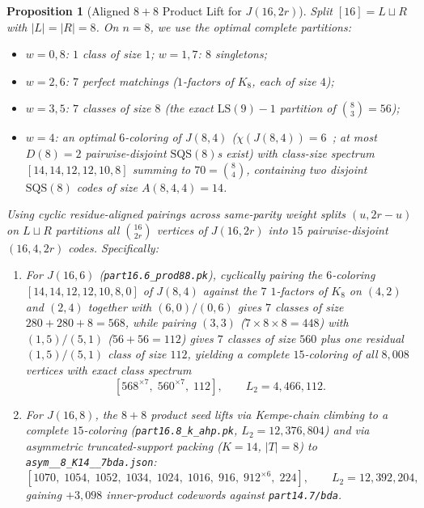 \documentclass[11pt,letterpaper]{article}
\theoremstyle{plain}
\newtheorem{proposition}{Proposition}
\theoremstyle{definition}
\theoremstyle{remark}
\begin{document}
\begin{proposition}[Aligned $8{+}8$ Product Lift for $J(16, 2r)$]
\label{prop:prod88}
Split $[16] = L \sqcup R$ with $|L| = |R| = 8$. On $n = 8$, we use the optimal complete partitions:
\begin{itemize}[leftmargin=1.6em,itemsep=1pt]
    \item $w = 0, 8$: $1$ class of size $1$; \quad $w = 1, 7$: $8$ singletons;
    \item $w = 2, 6$: $7$ perfect matchings ($1$-factors of $K_8$, each of size $4$);
    \item $w = 3, 5$: $7$ classes of size $8$ (the exact $\mathrm{LS}(9){-}1$ partition of $\binom{8}{3} = 56$);
    \item $w = 4$: an optimal $6$-coloring of $J(8,4)$ ($\chi(J(8,4)) = 6$~\cite{EtzionBitan1996}; at most $D(8) = 2$ pairwise-disjoint $\mathrm{SQS}(8)$s exist) with class-size spectrum $[14, 14, 12, 12, 10, 8]$ summing to $70 = \binom{8}{4}$, containing two disjoint $\mathrm{SQS}(8)$ codes of size $A(8,4,4) = 14$.
\end{itemize}
Using cyclic residue-aligned pairings across same-parity weight splits $(u, 2r - u)$ on $L \sqcup R$ partitions all $\binom{16}{2r}$ vertices of $J(16, 2r)$ into $15$ pairwise-disjoint $(16, 4, 2r)$ codes. Specifically:
\begin{enumerate}[leftmargin=1.6em,itemsep=1pt]
    \item For $J(16, 6)$ (\texttt{part16.6\_prod88.pk}), cyclically pairing the $6$-coloring $[14, 14, 12, 12, 10, 8, 0]$ of $J(8,4)$ against the $7$ $1$-factors of $K_8$ on $(4,2)$ and $(2,4)$ together with $(6,0)/(0,6)$ gives $7$ classes of size $280 + 280 + 8 = 568$, while pairing $(3,3)$ ($7 \times 8 \times 8 = 448$) with $(1,5)/(5,1)$ ($56 + 56 = 112$) gives $7$ classes of size $560$ plus one residual $(1,5)/(5,1)$ class of size $112$, yielding a complete $15$-coloring of all $8{,}008$ vertices with exact class spectrum
    \[
    [568^{\times 7},\; 560^{\times 7},\; 112], \qquad L_2 = 4{,}466{,}112.
    \]
    \item For $J(16, 8)$, the $8{+}8$ product seed lifts via Kempe-chain climbing to a complete $15$-coloring (\texttt{part16.8\_\allowbreak k\_ahp.pk}, $L_2 = 12{,}376{,}804$) and via asymmetric truncated-support packing ($K = 14$, $|T| = 8$) to \texttt{asym\_\_8\_\allowbreak K14\_\_7bda.json}:
    \[
    [1070,\; 1054,\; 1052,\; 1034,\; 1024,\; 1016,\; 916,\; 912^{\times 6},\; 224], \qquad L_2 = 12{,}392{,}204,
    \]
    gaining $+3{,}098$ inner-product codewords against \texttt{part14.7/bda}.
\end{enumerate}
\end{proposition}
\end{document}
